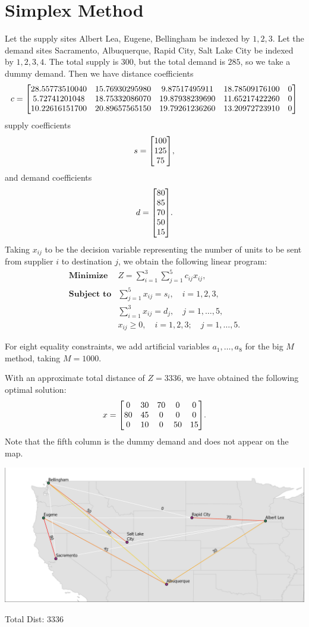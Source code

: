 \documentclass[12pt]{article}
\theoremstyle{definition}
\newcommand{\ds}{\displaystyle}
\begin{document}
\newpage
\section{Simplex Method}

Let the supply sites Albert Lea, Eugene, Bellingham be indexed by $1, 2, 3$. Let the demand sites Sacramento, Albuquerque, Rapid City, Salt Lake City be indexed by $1, 2, 3, 4$. The total supply is  $300$, but the total demand is $285$, so we take a dummy demand. Then we have distance coefficients
\[
    c = \mqty[
            28.55773510040 & 15.76930295980 & 9.87517495911 & 18.78509176100 & 0 \\
            5.72741201048 & 18.75332086070 & 19.87938239690 & 11.65217422260 & 0\\
            10.22616151700 & 20.89657565150 & 19.79261236260 & 13.20972723910 & 0
        ]
\]
supply coefficients
\[
    s = \mqty[100 \\ 125 \\ 75],
\]
and demand coefficients
\[
    d = \mqty[80 \\ 85 \\ 70 \\ 50 \\ 15].
\]
Taking $x_{ij}$ to be the decision variable representing the number of units to be sent from supplier $i$ to destination $j$, we obtain the following linear program:
\[\begin{array}{ll}
    \textbf{Minimize} & Z = \ds\sum_{i=1}^{3}\sum_{j=1}^{5} c_{ij}x_{ij}, \\
    \textbf{Subject to} & \ds\sum_{j=1}^{5} x_{ij} = s_i, \quad i = 1, 2, 3, \\
        & \ds\sum_{i=1}^{3} x_{ij} = d_j, \quad j = 1, \dots, 5, \\
        & x_{ij} \geq 0, \quad i = 1, 2, 3; \quad j = 1, \dots, 5.
\end{array}\]

For eight equality constraints, we add artificial variables $a_1, \dots, a_8$ for the big $M$ method, taking $M = 1000$.



With an approximate total distance of $Z = 3336$, we have obtained the following optimal solution:
\[
    x = \mqty[
        0 & 30 & 70 & 0 & 0 \\
        80 & 45 & 0 & 0 & 0 \\
        0 & 10 & 0 & 50 & 15
    ].
\]
Note that the fifth column is the dummy demand and does not appear on the map.

\includegraphics[width=\textwidth]{solmapmanual.png}

Total Dist: $3336$
\end{document}

